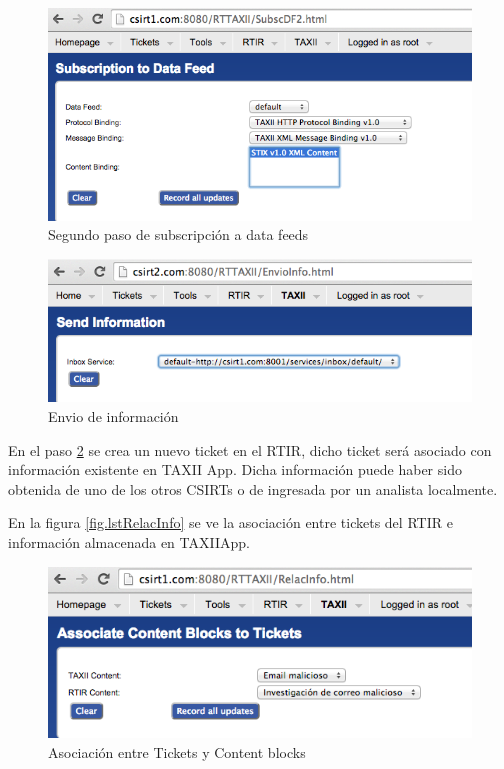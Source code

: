 \begin{figure}[H]
	\centering
	\includegraphics[scale=0.4]{caso-de-estudio/subscriptiondf.png}
	\caption{Segundo paso de subscripción a data feeds}
	\label{fig.subdf}
\end{figure}

\begin{figure}[H]
	\centering
	\includegraphics[scale=0.4]{caso-de-estudio/envioInfo.png}
	\caption{Envio de información}
	\label{fig.envioInfo}
\end{figure}

En el paso \ref{fig.envioInfo} se crea un nuevo ticket en el RTIR, dicho ticket será asociado con información existente en TAXII App. Dicha información puede haber sido obtenida de uno de los otros CSIRTs o de ingresada por un analista localmente.

En la figura \ref{fig.lstRelacInfo} se ve la asociación entre tickets del RTIR e información almacenada en TAXIIApp.

\begin{figure}[H]
	\centering
	\includegraphics[scale=0.4]{caso-de-estudio/relacInfo.png}
	\caption{Asociación entre Tickets y Content blocks}
	\label{fig.relacInfo}
\end{figure}

